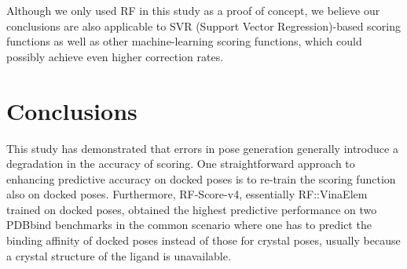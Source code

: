 \documentclass[twocolumn]{bmcart}
\begin{document}
Although we only used RF in this study as a proof of concept, we believe our conclusions are also applicable to SVR (Support Vector Regression)-based scoring functions \cite{1295,963} as well as other machine-learning scoring functions, which could possibly achieve even higher correction rates.

\section*{Conclusions}

This study has demonstrated that errors in pose generation generally introduce a degradation in the accuracy of scoring. One straightforward approach to enhancing predictive accuracy on docked poses is to re-train the scoring function also on docked poses. Furthermore, RF-Score-v4, essentially RF::VinaElem trained on docked poses, obtained the highest predictive performance on two PDBbind benchmarks in the common scenario where one has to predict the binding affinity of docked poses instead of those for crystal poses, usually because a crystal structure of the ligand is unavailable. %

\end{document}

